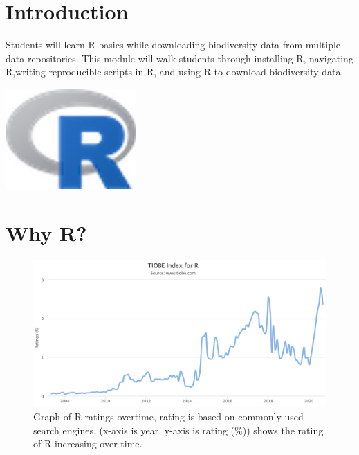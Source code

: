 \documentclass[
]{book}
\begin{document}
\hypertarget{intro}{%
\section{Introduction}\label{intro}}

Students will learn R basics while downloading biodiversity data from multiple data repositories. This module will walk students through installing R, navigating R,writing reproducible scripts in R, and using R to download biodiversity data.

\begin{center}\includegraphics[width=1.97in]{img/Rlogo} \end{center}

\hypertarget{why-r}{%
\section{Why R?}\label{why-r}}

\begin{figure}
\centering
\includegraphics[width=4.77083in,height=\textheight]{img/Rtiobes.png}
\caption{Graph of R ratings overtime, rating is based on commonly used search engines, (x-axis is year, y-axis is rating (\%)) shows the rating of R increasing over time.}
\end{figure}
\end{document}
